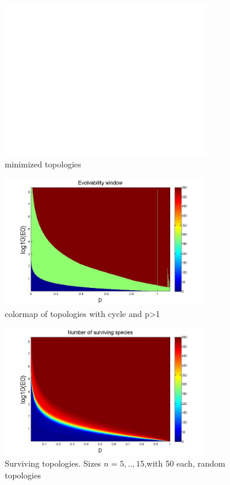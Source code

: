 \documentclass{amsart}
\theoremstyle{plain}
\numberwithin{equation}{section}
\begin{document}
\begin{figure}[p]
    \centering
    \includegraphics[width=0.8\textwidth]{untitled.jpg}
    \caption{minimized topologies}
    \label{fig5}
\end{figure}

\begin{figure}[p]
    \centering
    \includegraphics[width=0.8\textwidth]{topcycle.jpg}
    \caption{colormap of topologies with cycle and p>1}
    \label{fig6}
\end{figure}

\begin{figure}[p]
    \centering
    \includegraphics[width=0.8\textwidth]{colormap.jpg}
    \caption{Surviving topologies. Sizes $n=5,..,15$,with 50 each, random topologies}
    \label{fig7}
\end{figure}
\end{document}
